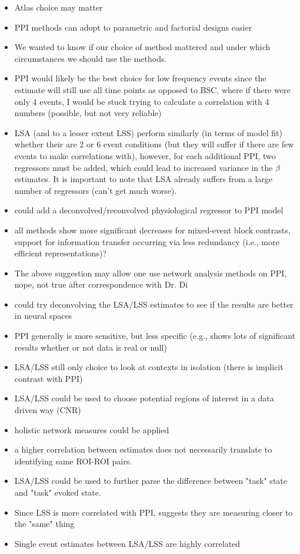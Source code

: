 \documentclass[phd,appendix,figures]{uithesis}
\begin{document}
\begin{itemize}
  \item Atlas choice may matter
  \item PPI methods can adopt to parametric and factorial designs easier
  \item We wanted to know if our choice of method mattered and under which circumstances we should use the methods.
  \item PPI would likely be the best choice for low frequency events since the estimate will still use all time points
        as opposed to BSC, where if there were only 4 events, I would be stuck trying to calculate a correlation with 4 numbers
        (possible, but not very reliable)
  \item LSA (and to a lesser extent LSS) perform similarly (in terms of model fit) whether their are 2 or 6 event conditions
        (but they will suffer if there are few events to make correlations with), however, for each additional PPI,
        two regressors must be added, which could lead to increased variance in the $\beta$ estimates.
        It is important to note that LSA already suffers from a large number of regressors (can't get much worse). 
  \item could add a deconvolved/reconvolved physiological regressor to PPI model
  \item all methods show more significant decreases for mixed-event block contrasts, support for information transfer occurring via less redundancy
        (i.e., more efficient representations)?
  \item The above suggestion may allow one use network analysis methods on PPI, nope, not true after correspondence with Dr. Di
  \item could try deconvolving the LSA/LSS estimates to see if the results are better in neural spaces
	\item PPI generally is more sensitive, but less specific (e.g., shows lots of significant results whether or not data is real or null)
	\item LSA/LSS still only choice to look at contexts in isolation (there is implicit contrast with PPI)
	\item LSA/LSS could be used to choose potential regions of interest in a data driven way (CNR)
	\item holistic network measures could be applied
	\item a higher correlation between estimates does not necessarily translate to identifying same ROI-ROI pairs.
	\item LSA/LSS could be used to further parse the difference between "task" state and "task" evoked state.
	\item Since LSS is more correlated with PPI, suggests they are measuring closer to the "same" thing
	\item Single event estimates between LSA/LSS are highly correlated
\end{itemize}
\appendix
\end{document}
